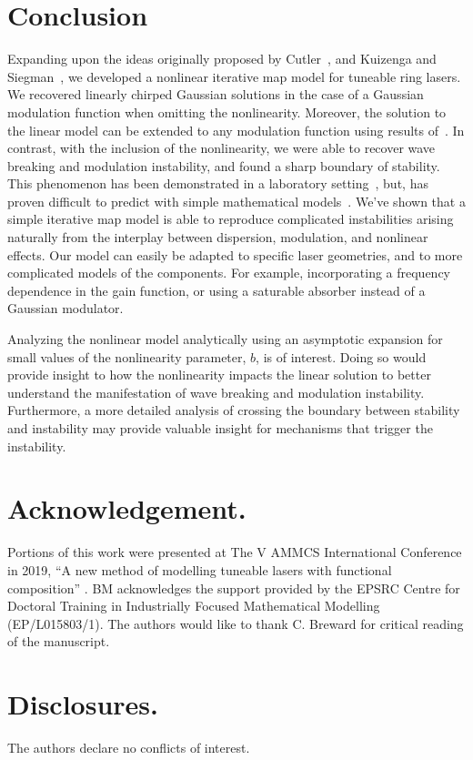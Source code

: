 \documentclass[9pt,twocolumn,twoside]{osajnl}
\begin{document}
\section{Conclusion}
\label{sec:conclusion}
Expanding upon the ideas originally proposed by Cutler~\cite{cutler1955}, and Kuizenga and Siegman~\cite{kuizenga1970, kuizenga1970a, siegman1969}, we developed a nonlinear iterative map model for tuneable ring lasers. We recovered linearly chirped Gaussian solutions in the case of a Gaussian modulation function when omitting the nonlinearity. Moreover, the solution to the linear model can be extended to any modulation function using results of~\cite{calcaterra2008a}. In contrast, with the inclusion of the nonlinearity, we were able to recover wave breaking and modulation instability, and found a sharp boundary of stability. This phenomenon has been demonstrated in a laboratory setting~\cite{agrawal2013, anderson1992, finot2008, rothenberg1989b, tomlinson1985}, but, has proven difficult to predict with simple mathematical models~\cite{meng2020}. We've shown that a simple iterative map model is able to reproduce complicated instabilities arising naturally from the interplay between dispersion, modulation, and nonlinear effects. Our model can easily be adapted to specific laser geometries, and to more complicated models of the components. For example, incorporating a frequency dependence in the gain function, or using a saturable absorber instead of a Gaussian modulator.

Analyzing the nonlinear model analytically using an asymptotic expansion for small values of the nonlinearity parameter, $b$, is of interest. Doing so would provide insight to how the nonlinearity impacts the linear solution to better understand the manifestation of wave breaking and modulation instability. Furthermore, a more detailed analysis of crossing the boundary between stability and instability may provide valuable insight for mechanisms that trigger the instability.

\section*{Acknowledgement.}

Portions of this work were presented at The V AMMCS International Conference in 2019, ``A new method of modelling tuneable lasers with functional composition'' \cite{metherallammcs}. BM acknowledges the support provided by the EPSRC Centre for Doctoral Training in Industrially Focused Mathematical Modelling (EP/L015803/1). The authors would like to thank C. Breward for critical reading of the manuscript.

\section*{Disclosures.}
The authors declare no conflicts of interest.


\end{document}
